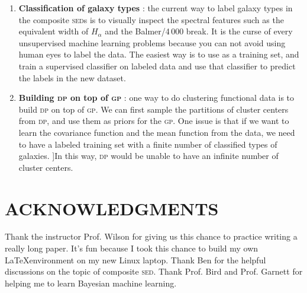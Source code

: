 \documentclass{ar-1col}
\begin{document}
\begin{issues}
\begin{enumerate}
    \item {\bf Classification of galaxy types }: the current way to label galaxy types in the composite \textsc{sed}s is to visually inspect the spectral features such as the equivalent width of $H_\alpha$ and the Balmer/4\,000 break. It is the curse of every unsupervised machine learning problems because you can not avoid using human eyes to label the data. 
    The easiest way is to use \citet{Forrest2018} as a training set, and train a supervised classifier on labeled data and use that classifier to predict the labels in the new dataset. 
    \item {\bf Building \textsc{dp} on top of \textsc{gp} }: one way to do clustering functional data is to build \textsc{dp} on top of \textsc{gp}. 
    We can first sample the partitions of cluster centers from \textsc{dp}, and use them as priors for the \textsc{gp}. 
    One issue is that if we want to learn the covariance function and the mean function from the data, we need to have a labeled training set with a finite number of classified types of galaxies. 
    ]In this way, \textsc{dp} would be unable to have an infinite number of cluster centers.
\end{enumerate}
\end{issues}

 
\section*{ACKNOWLEDGMENTS}

Thank the instructor Prof. Wilson for giving us this chance to practice writing a really long paper. 
It's fun because I took this chance to build my own \LaTeX environment on my new Linux laptop.
Thank Ben for the helpful discussions on the topic of composite \textsc{sed}.
Thank Prof. Bird and Prof. Garnett for helping me to learn Bayesian machine learning.



\end{document}
